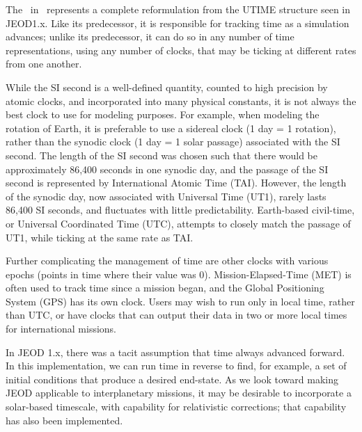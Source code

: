 %
%
% 
%
The \timeDesc\ in \JEODid\ represents a
complete reformulation from the UTIME structure seen in JEOD1.x.  Like
its predecessor, it is responsible for tracking time as a simulation
advances; unlike its predecessor, it can do so in any number of time 
representations, using any number of clocks, that may be ticking at
different rates from one another.


While the SI second is a well-defined quantity, counted to high 
precision by atomic clocks, and incorporated into many physical
constants, it is not always the best clock to use for modeling
purposes.  For example, when modeling the rotation of Earth, it is
preferable to use a sidereal clock (1 day = 1 rotation), rather than
the synodic clock (1 day = 1 solar passage) associated with the SI
second.  The length of the SI second was chosen such that there would
be approximately 86,400 seconds in one synodic day, and the passage of
the SI second is represented by International Atomic Time (TAI).
 However, the length of the synodic day, now associated with Universal
Time (UT1), rarely lasts 86,400 SI seconds, and fluctuates with little
predictability.  Earth-based civil-time, or Universal Coordinated
Time (UTC), attempts to closely match the passage of UT1, while ticking 
at the same rate as TAI.  


Further complicating the management of time are other clocks with
various epochs (points in time where their value was 0). 
 Mission-Elapsed-Time (MET) is often used to track time since a 
mission began, and the Global Positioning System (GPS) has its own clock.
Users may wish to run only in local time, rather than UTC, or 
have clocks that can output their data in two or more local times for
international missions.

In JEOD 1.x, there was a tacit assumption that time always advanced
forward.  In this implementation, we can run time in reverse to find,
for example, a set of initial conditions that produce a desired
end-state.  As we look toward making JEOD applicable to
interplanetary missions, it may be desirable to incorporate a
solar-based timescale, with capability for relativistic corrections;
that capability has also been implemented.












